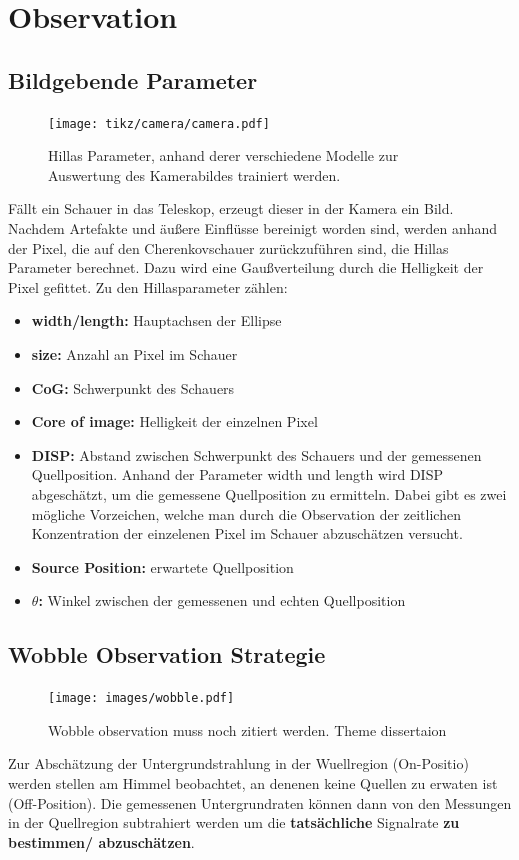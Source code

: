 \chapter{Observation}
\section{Bildgebende Parameter}
\begin{figure}[H]
  \centering
  \texttt{[image: tikz/camera/camera.pdf]}
  \caption{Hillas Parameter, anhand derer verschiedene Modelle zur Auswertung des Kamerabildes trainiert werden.}
\end{figure}
Fällt ein Schauer in das Teleskop, erzeugt dieser in der Kamera ein Bild. 
Nachdem Artefakte und äußere Einflüsse bereinigt worden sind, werden anhand der Pixel, die auf den Cherenkovschauer zurückzuführen sind, die Hillas Parameter berechnet. 
Dazu wird eine Gaußverteilung durch die Helligkeit der Pixel gefittet. 
Zu den Hillasparameter zählen:
\begin{itemize}
  \item \textbf{width/length:} Hauptachsen der Ellipse
  \item \textbf{size:} Anzahl an Pixel im Schauer
  \item \textbf{CoG:} Schwerpunkt des Schauers
  \item \textbf{Core of image:} Helligkeit der einzelnen Pixel
  \item \textbf{DISP:} Abstand zwischen Schwerpunkt des Schauers und der gemessenen Quellposition. Anhand der Parameter width und length wird DISP abgeschätzt, um die gemessene Quellposition zu ermitteln. Dabei gibt es zwei mögliche Vorzeichen, welche man durch die Observation der zeitlichen Konzentration der einzelenen Pixel im Schauer abzuschätzen versucht.
  \item \textbf{Source Position:} erwartete Quellposition
  \item \textbf{$\theta$:} Winkel zwischen der gemessenen und echten Quellposition
\end{itemize}
\section{Wobble Observation Strategie}
\begin{figure}
  \texttt{[image: images/wobble.pdf]}
  \caption{Wobble observation muss noch zitiert werden. Theme dissertaion}
\end{figure}
Zur Abschätzung der Untergrundstrahlung in der Wuellregion (On-Positio) werden stellen am Himmel beobachtet, an denenen keine Quellen zu erwaten ist (Off-Position).
Die gemessenen Untergrundraten können dann von den Messungen in der Quellregion subtrahiert werden um die \textbf{tatsächliche} Signalrate \textbf{zu bestimmen/ abzuschätzen}.

